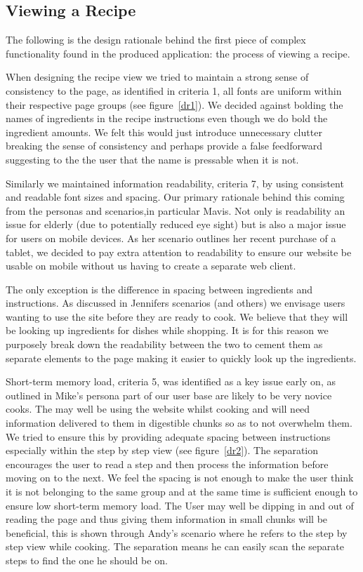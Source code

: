 \subsection{Viewing a Recipe}
The following is the design rationale behind the first piece of complex functionality found in the produced application: the process of viewing a recipe.

When designing the recipe view we tried to maintain a strong sense of consistency to the page, as identified in criteria 1, all fonts are uniform within their respective page groups (see figure~\ref{dr1}). We decided against bolding the names of ingredients in the recipe instructions even though we do bold the ingredient amounts. We felt this would just introduce unnecessary clutter breaking the sense of consistency and perhaps provide a false feedforward suggesting to the the user that the name is pressable when it is not.

Similarly we maintained information readability, criteria 7, by using consistent and readable font sizes and spacing. Our primary rationale behind this coming from the personas and scenarios,in particular Mavis. Not only is readability an issue for elderly (due to potentially reduced eye sight) but is also a major issue for users on mobile devices. As her scenario outlines her recent purchase of a tablet, we decided to pay extra attention to readability to ensure our website be usable on mobile without us having to create a separate web client.

The only exception is the difference in spacing between ingredients and instructions. As discussed in Jennifers scenarios (and others) we envisage users wanting to use the site before they are ready to cook. We believe that they will be looking up ingredients for dishes while shopping. It is for this reason we purposely break down the readability between the two to cement them as separate elements to the page making it easier to quickly look up the ingredients.

Short-term memory load, criteria 5, was identified as a key issue early on, as outlined in Mike's persona part of our user base are likely to be very novice cooks. The may well be using the website whilst cooking and will need information delivered to them in digestible chunks so as to not overwhelm them. We tried to ensure this by providing adequate spacing between instructions especially within the step by step view (see figure~\ref{dr2}). The separation encourages the user to read a step and then process the information before moving on to the next. We feel the spacing is not enough to make the user think it is not belonging to the same group and at the same time is sufficient enough to ensure low short-term memory load. The User may well be dipping in and out of reading the page and thus giving them information in small chunks will be beneficial, this is shown through Andy's scenario where he refers to the step by step view while cooking. The separation means he can easily scan the separate steps to find the one he should be on.

